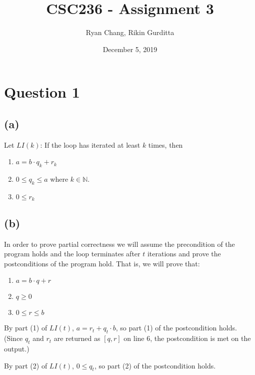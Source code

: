 \documentclass[12pt]{article}
\title{CSC236 - Assignment 3}
\author{Ryan Chang, Rikin Gurditta}
\date{December 5, 2019}
\newcommand{\N}{\mathbb{N}}
\begin{document}
\maketitle
\newpage
\section*{Question 1}
\subsection*{(a)}
 
Let $LI(k)$: If the loop has iterated at least $k$ times, then
\begin{enumerate}[label=(\arabic{enumi})]
    \item $a = b \cdot q_k + r_k$
    \item $0 \leq q_k \leq a$ where $k \in \N$.
    \item $0 \leq r_k$
\end{enumerate}


    
\subsection*{(b)}

In order to prove partial correctness we will assume the precondition of the program holds and the loop terminates after $t$ iterations and prove the postconditions of the program hold. That is, we will prove that:
\begin{enumerate}[label=(\arabic{enumi})]
    \item $a = b \cdot q + r$
    \item $q \geq 0$
    \item $0 \leq r \leq b$
\end{enumerate}

\hfill

By part (1) of $LI(t)$, $a = r_t + q_t \cdot b$, so part (1) of the postcondition holds. (Since $q_t$ and $r_t$ are returned as $[q, r]$ on line 6, the postcondition is met on the output.)

By part (2) of $LI(t)$, $0 \leq q_t$, so part (2) of the postcondition holds.
\end{document}

